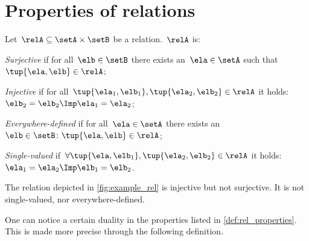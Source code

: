 

\section{Properties of relations}


\begin{definition}
  \label{def:rel_properties}
  Let~$\relA\subseteq \setA \times \setB$ be a relation.~$\relA$ is:
  \begin{compactenum}
    \item \emph{Surjective} if for all~$\elb\in \setB$ there exists an~$\ela\in \setA$ such that~$\tup{\ela,\elb}\in \relA$;
    \item \emph{Injective} if for all~$ \tup{\ela_1,\elb_1},\tup{\ela_2,\elb_2}\in \relA$ it holds:~$\elb_2=\elb_2 \Imp \ela_1=\ela_2$;
    \item \emph{Everywhere-defined} if for all~$\ela\in \setA$ there exists an ~$\elb \in \setB\colon \tup{\ela,\elb}\in \relA$;
    \item \emph{Single-valued} if~$\forall \tup{\ela,\elb_1},\tup{\ela_2,\elb_2}\in \relA$ it holds:~$\ela_1=\ela_2\Imp \elb_1=\elb_2$.
  \end{compactenum}
\end{definition}

\begin{example}
  The relation depicted in \cref{fig:example_rel} is injective but not surjective. It is not single-valued, nor everywhere-defined. \end{example}

One can notice a certain duality in the properties listed in \cref{def:rel_properties}. This is made more precise through the following definition.

